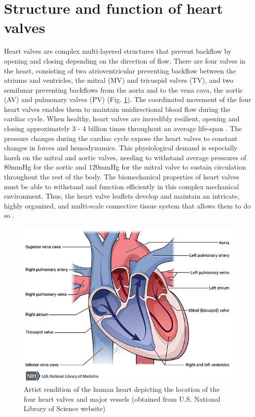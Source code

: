 \section{Structure and function of heart valves}
    
    Heart valves are complex multi-layered structures that prevent backflow by opening and closing depending on the direction of flow. There are four valves in the heart, consisting of two atrioventricular preventing backflow between the atriums and ventricles, the mitral (MV) and tricuspid valves (TV), and two semilunar preventing backflows from the aorta and to the vena cava, the aortic (AV) and pulmonary valves (PV) (Fig. \ref{fig:heartdiagram}). The coordinated movement of the four heart valves enables them to maintain unidirectional blood flow during the cardiac cycle. When healthy, heart valves are incredibly resilient, opening and closing approximately 3 - 4 billion times throughout an average life-span \cite{sacks_biomechanics_2009}. The pressure changes during the cardiac cycle expose the heart valves to constant changes in forces and hemodynamics. This physiological demand is especially harsh on the mitral and aortic valves, needing to withstand average pressures of 80mmHg for the aortic and 120mmHg for the mitral valve to sustain circulation throughout the rest of the body. The biomechanical properties of heart valves must be able to withstand and function efficiently in this complex mechanical environment. Thus, the heart valve leaflets develop and maintain an intricate, highly organized, and multi-scale connective tissue system that allows them to do so \cite{tao_heart_2012}. 

\begin{figure}
\centering
\includegraphics[width=5.0in]{Images/chapter1/heartdiagram.jpeg}
\caption{Artist rendition of the human heart depicting the location of the four heart valves and major vessels (obtained from U.S. National Library of Science website)}
\label{fig:heartdiagram}
\end{figure}

